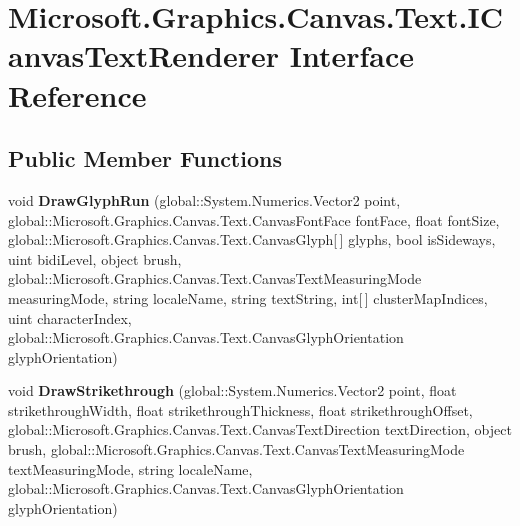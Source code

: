 \hypertarget{interface_microsoft_1_1_graphics_1_1_canvas_1_1_text_1_1_i_canvas_text_renderer}{}\section{Microsoft.\+Graphics.\+Canvas.\+Text.\+I\+Canvas\+Text\+Renderer Interface Reference}
\label{interface_microsoft_1_1_graphics_1_1_canvas_1_1_text_1_1_i_canvas_text_renderer}
\subsection*{Public Member Functions}
\begin{DoxyCompactItemize}
\item 
\mbox{\label{interface_microsoft_1_1_graphics_1_1_canvas_1_1_text_1_1_i_canvas_text_renderer_a251cf38ca7077b36bbfacf617f946c68}} 
void {\bfseries Draw\+Glyph\+Run} (global\+::\+System.\+Numerics.\+Vector2 point, global\+::\+Microsoft.\+Graphics.\+Canvas.\+Text.\+Canvas\+Font\+Face font\+Face, float font\+Size, global\+::\+Microsoft.\+Graphics.\+Canvas.\+Text.\+Canvas\+Glyph\mbox{[}$\,$\mbox{]} glyphs, bool is\+Sideways, uint bidi\+Level, object brush, global\+::\+Microsoft.\+Graphics.\+Canvas.\+Text.\+Canvas\+Text\+Measuring\+Mode measuring\+Mode, string locale\+Name, string text\+String, int\mbox{[}$\,$\mbox{]} cluster\+Map\+Indices, uint character\+Index, global\+::\+Microsoft.\+Graphics.\+Canvas.\+Text.\+Canvas\+Glyph\+Orientation glyph\+Orientation)
\item 
\mbox{\label{interface_microsoft_1_1_graphics_1_1_canvas_1_1_text_1_1_i_canvas_text_renderer_a554332d1d991fdd8a01a27fe4b6ce0d0}} 
void {\bfseries Draw\+Strikethrough} (global\+::\+System.\+Numerics.\+Vector2 point, float strikethrough\+Width, float strikethrough\+Thickness, float strikethrough\+Offset, global\+::\+Microsoft.\+Graphics.\+Canvas.\+Text.\+Canvas\+Text\+Direction text\+Direction, object brush, global\+::\+Microsoft.\+Graphics.\+Canvas.\+Text.\+Canvas\+Text\+Measuring\+Mode text\+Measuring\+Mode, string locale\+Name, global\+::\+Microsoft.\+Graphics.\+Canvas.\+Text.\+Canvas\+Glyph\+Orientation glyph\+Orientation)
\item 

\end{DoxyCompactItemize}
